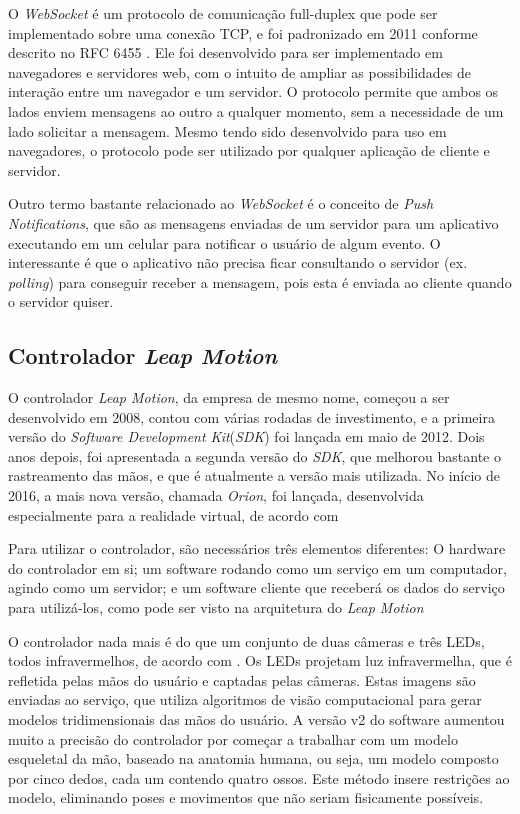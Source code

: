 O \textit{WebSocket} é um protocolo de comunicação full-duplex que pode ser implementado
sobre uma conexão TCP, e foi padronizado em 2011 conforme descrito no RFC 6455
\cite{RFC:2011:websocket}. Ele foi desenvolvido para ser implementado em 
navegadores e servidores web, com o intuito de ampliar as possibilidades de
interação entre um navegador e um servidor. O protocolo permite que ambos os 
lados enviem mensagens ao outro a qualquer momento, sem a necessidade de um 
lado solicitar a mensagem. Mesmo tendo sido desenvolvido para uso em navegadores, 
o protocolo pode ser utilizado por qualquer aplicação de cliente e servidor.

Outro termo bastante relacionado ao \textit{WebSocket} é o conceito de 
\textit{Push Notifications}, que são as mensagens enviadas de um servidor para 
um aplicativo executando em um celular para notificar o usuário de algum evento. 
O interessante é que o aplicativo não precisa ficar consultando o servidor 
(ex. \textit{polling}) para conseguir receber a mensagem, pois esta é enviada 
ao cliente quando o servidor quiser.

\subsection{Controlador \textit{Leap Motion}}\label{subsec-teo-leap-motion}

O controlador \textit{Leap Motion}, da empresa de mesmo nome, começou a ser desenvolvido 
em 2008, contou com várias rodadas de investimento, e a primeira versão do 
\textit{Software Development Kit}(\textit{SDK}) foi lançada em maio de 2012. Dois anos depois, foi 
apresentada a segunda versão do \textit{SDK}, que melhorou bastante o rastreamento das 
mãos, e que é atualmente a versão mais utilizada. No início de 2016, a mais 
nova versão, chamada \textit{Orion}, foi lançada, desenvolvida especialmente para a 
realidade virtual, de acordo com \cite{leap:2016:changeset}

Para utilizar o controlador, são necessários três elementos diferentes: O hardware 
do controlador em si; um software rodando como um serviço em um computador, agindo como um servidor; 
e um software cliente que receberá os dados do serviço para utilizá-los, 
como pode ser visto na arquitetura do \textit{Leap Motion} \cite{leap:2016:architecture}

O controlador nada mais é do que um conjunto de duas câmeras e três LEDs, todos 
infravermelhos, de acordo com \cite{leap:2016:how-it-works}. Os LEDs projetam
luz infravermelha, que é refletida pelas mãos do usuário e captadas 
pelas câmeras. Estas imagens são enviadas ao serviço, 
que utiliza algoritmos de visão computacional para gerar modelos tridimensionais 
das mãos do usuário. A versão v2 do software aumentou muito a precisão do 
controlador por começar a trabalhar com um modelo esqueletal da mão, baseado 
na anatomia humana, ou seja, um modelo composto por cinco dedos, cada um contendo 
quatro ossos. Este método insere restrições ao modelo, eliminando poses e movimentos 
que não seriam fisicamente possíveis.

